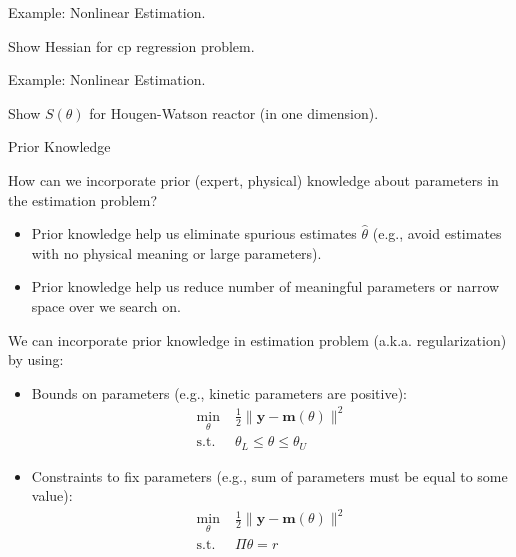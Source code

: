 \documentclass[9pt]{beamer}
\begin{document}
%
\begin{frame}{Example: Nonlinear Estimation.}

\begin{block}{}
Show Hessian for cp regression problem.
\end{block}

\end{frame}

%
\begin{frame}{Example: Nonlinear Estimation.}

\begin{block}{}
Show $S(\theta)$ for Hougen-Watson reactor (in one dimension). 
\end{block}

\end{frame}


%
\begin{frame}{Prior Knowledge}

\begin{block}{}
How can we incorporate prior (expert, physical) knowledge about parameters in the estimation problem? 
\end{block}
\begin{itemize}
\item Prior knowledge help us eliminate spurious estimates $\hat{\theta}$ (e.g., avoid estimates with no physical meaning or large parameters). 
\item Prior knowledge help us reduce number of meaningful parameters or narrow space over we search on.
\end{itemize}
We can incorporate prior knowledge in estimation problem (a.k.a. regularization) by using: 
\begin{itemize}
\item Bounds on parameters (e.g., kinetic parameters are positive):
\begin{align*}
\min_{\theta}& \; \frac{1}{2}\|\mathbf{y}- \mathbf{m}(\theta)\|^2\\ 
\textrm{s.t.}&\; \theta_L\leq \theta\leq\theta_U 
\end{align*}
\item Constraints to fix parameters (e.g., sum of parameters must be equal to some value):
\begin{align*}
\min_{\theta}& \; \frac{1}{2}\|\mathbf{y}- \mathbf{m}(\theta)\|^2\\ 
\textrm{s.t.}&\; \Pi \theta = r
\end{align*}

\end{itemize}
\end{frame}
\end{document}
